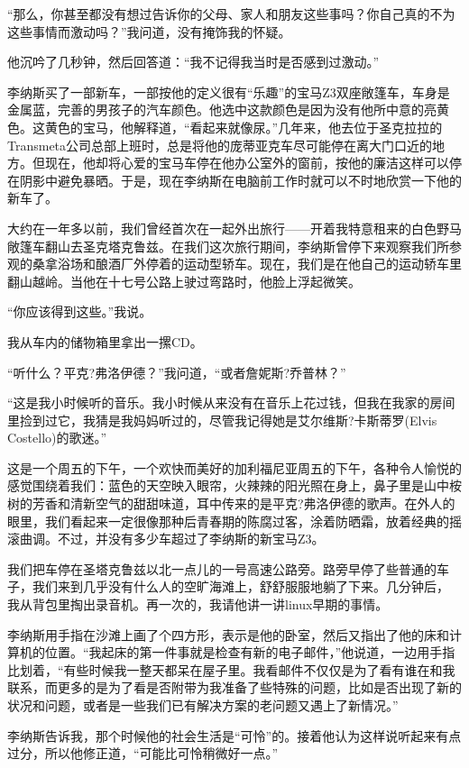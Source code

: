 “那么，你甚至都没有想过告诉你的父母、家人和朋友这些事吗？你自己真的不为这些事情而激动吗？”我问道，没有掩饰我的怀疑。

他沉吟了几秒钟，然后回答道：“我不记得我当时是否感到过激动。”

李纳斯买了一部新车，一部按他的定义很有“乐趣”的宝马Z3双座敞篷车，车身是金属蓝，完善的男孩子的汽车颜色。他选中这款颜色是因为没有他所中意的亮黄色。这黄色的宝马，他解释道，“看起来就像尿。”几年来，他去位于圣克拉拉的Transmeta公司总部上班时，总是将他的庞蒂亚克车尽可能停在离大门口近的地方。但现在，他却将心爱的宝马车停在他办公室外的窗前，按他的廉洁这样可以停在阴影中避免暴晒。于是，现在李纳斯在电脑前工作时就可以不时地欣赏一下他的新车了。

大约在一年多以前，我们曾经首次在一起外出旅行——开着我特意租来的白色野马敞篷车翻山去圣克塔克鲁兹。在我们这次旅行期间，李纳斯曾停下来观察我们所参观的桑拿浴场和酿酒厂外停着的运动型轿车。现在，我们是在他自己的运动轿车里翻山越岭。当他在十七号公路上驶过弯路时，他脸上浮起微笑。

“你应该得到这些。”我说。

我从车内的储物箱里拿出一摞CD。

“听什么？平克?弗洛伊德？”我问道，“或者詹妮斯?乔普林？”

“这是我小时候听的音乐。我小时候从来没有在音乐上花过钱，但我在我家的房间里捡到过它，我猜是我妈妈听过的，尽管我记得她是艾尔维斯?卡斯蒂罗(Elvis Costello)的歌迷。”

这是一个周五的下午，一个欢快而美好的加利福尼亚周五的下午，各种令人愉悦的感觉围绕着我们：蓝色的天空映入眼帘，火辣辣的阳光照在身上，鼻子里是山中桉树的芳香和清新空气的甜甜味道，耳中传来的是平克?弗洛伊德的歌声。在外人的眼里，我们看起来一定很像那种后青春期的陈腐过客，涂着防晒霜，放着经典的摇滚曲调。不过，并没有多少车超过了李纳斯的新宝马Z3。

我们把车停在圣塔克鲁兹以北一点儿的一号高速公路旁。路旁早停了些普通的车子，我们来到几乎没有什么人的空旷海滩上，舒舒服服地躺了下来。几分钟后， 我从背包里掏出录音机。再一次的，我请他讲一讲linux早期的事情。

李纳斯用手指在沙滩上画了个四方形，表示是他的卧室，然后又指出了他的床和计算机的位置。“我起床的第一件事就是检查有新的电子邮件，”他说道，一边用手指比划着，“有些时候我一整天都呆在屋子里。我看邮件不仅仅是为了看有谁在和我联系，而更多的是为了看是否附带为我准备了些特殊的问题，比如是否出现了新的状况和问题，或者是一些我们已有解决方案的老问题又遇上了新情况。”

李纳斯告诉我，那个时候他的社会生活是“可怜”的。接着他认为这样说听起来有点过分，所以他修正道，“可能比可怜稍微好一点。”

